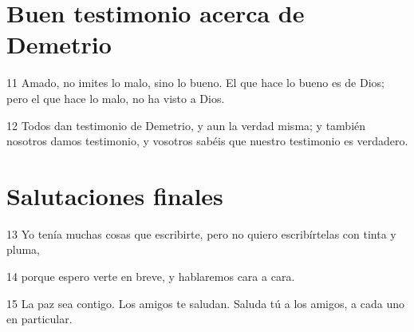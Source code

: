 \section*{Buen testimonio acerca de Demetrio}

\par 11 Amado, no imites lo malo, sino lo bueno. El que hace lo bueno es de Dios; pero el que hace lo malo, no ha visto a Dios.
\par 12 Todos dan testimonio de Demetrio, y aun la verdad misma; y también nosotros damos testimonio, y vosotros sabéis que nuestro testimonio es verdadero.

\section*{Salutaciones finales}

\par 13 Yo tenía muchas cosas que escribirte, pero no quiero escribírtelas con tinta y pluma,
\par 14 porque espero verte en breve, y hablaremos cara a cara.
\par 15 La paz sea contigo. Los amigos te saludan. Saluda tú a los amigos, a cada uno en particular.

